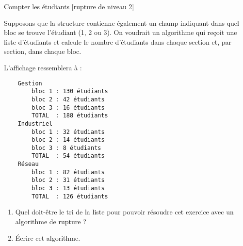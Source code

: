 \begin{Exercice}{Compter les étudiants [rupture de niveau 2]}
	
	Supposons que la structure  contienne également
	un champ indiquant dans quel bloc se trouve l'étudiant (1, 2 ou 3).
	On voudrait un algorithme qui reçoit une liste d'étudiants et calcule
	le nombre d'étudiants dans chaque section et, par section, dans chaque bloc.
	
	L'affichage ressemblera à :
	{\small
	\begin{verbatim}
    Gestion
        bloc 1 : 130 étudiants
        bloc 2 : 42 étudiants
        bloc 3 : 16 étudiants
        TOTAL  : 188 étudiants
    Industriel
        bloc 1 : 32 étudiants
        bloc 2 : 14 étudiants
        bloc 3 : 8 étudiants
        TOTAL  : 54 étudiants
    Réseau
        bloc 1 : 82 étudiants
        bloc 2 : 31 étudiants
        bloc 3 : 13 étudiants
        TOTAL  : 126 étudiants
	\end{verbatim}
	}
	\begin{enumerate}[label=\alph*)]
		\item 
		Quel doit-être le tri de la liste pour pouvoir résoudre cet exercice
		avec un algorithme de rupture ?
		\item 
		Écrire cet algorithme.
	\end{enumerate}
\end{Exercice}
	
